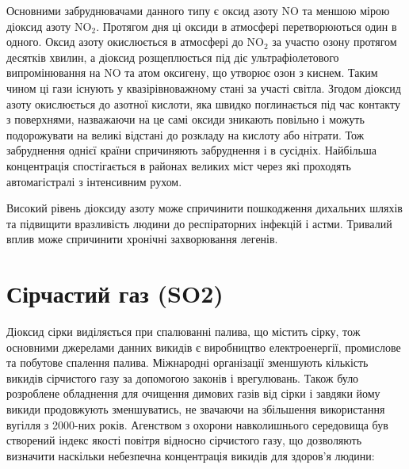 \begin{center}
\end{center}

\vspace{0.75cm}



Основними забруднювачами данного типу є оксид азоту $\mathrm{NO}$ та меншою мірою 
діоксид азоту $\mathrm{NO}_2$. Протягом дня ці оксиди в атмосфері перетворюються один в одного. 
Оксид азоту окислюється в атмосфері до $\mathrm{NO}_2$ за участю озону протягом десятків 
хвилин, а діоксид розщеплюється під діє ультрафіолетового випромінювання на $\mathrm{NO}$ та 
атом оксигену, що утворює озон з киснем. Таким чином ці гази існують у квазірівноважному стані 
за участі світла. Згодом діоксид азоту окислюється до азотної кислоти, яка швидко поглинається 
під час контакту з поверхнями, назважаючи на це самі оксиди зникають повільно і 
можуть подорожувати на великі відстані до розкладу на кислоту або нітрати. Тож забруднення 
однієї країни спричиняють забруднення і в сусідніх. Найбільша концентрація 
спостігається в районах великих міст через які проходять автомагістралі з інтенсивним рухом.\cite{noauthor_nitrogen_nodate}

Високий рівень діоксиду азоту може спричинити пошкодження дихальних шляхів та 
підвищити вразливість людини до респіраторних інфекцій і астми.
Тривалий вплив може спричинити хронічні захворювання легенів.


\section{Сірчастий газ (SO2)}

Діоксид сірки виділяється при спалюванні палива, що містить сірку, тож основними джерелами 
данних викидів є виробництво електроенергії, промислове та побутове спалення палива. Міжнародні 
організації зменшують кількість викидів сірчистого газу за допомогою законів і врегулювань. 
Також було розроблене обладнення для очищення димових газів від сірки і завдяки йому викиди 
продовжують зменшуватись, не звачаючи на збільшення використання вугілля з 2000-них років.
Агенством з охорони навколишнього середовища був створений індекс якості повітря відносно 
сірчистого газу, що дозволяють визначити наскільки небезпечна концентрація викидів для 
здоров'я людини:


